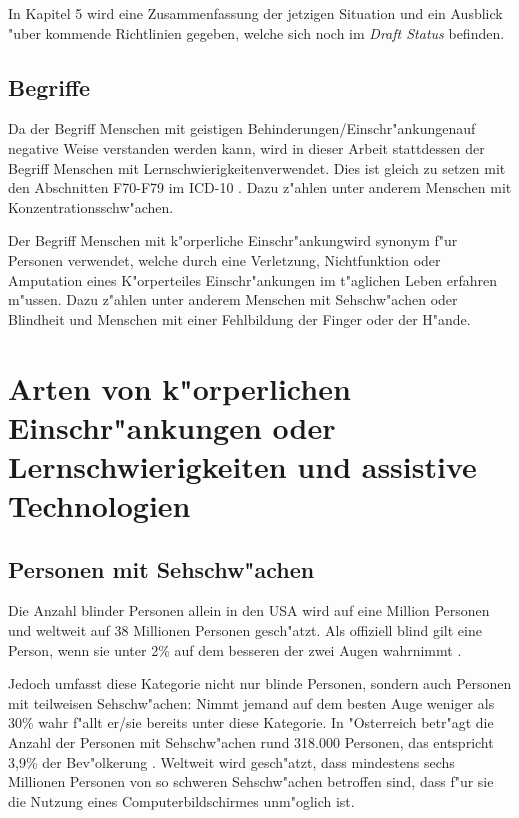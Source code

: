 \documentclass[a4paper,bibtotoc,oneside]{scrbook}
\begin{document}
In Kapitel 5 wird eine Zusammenfassung der jetzigen Situation und ein Ausblick "uber kommende Richtlinien gegeben, welche sich noch im \emph{Draft Status} befinden.

\section{Begriffe}
Da der Begriff \glqq Menschen mit geistigen Behinderungen/Einschr"ankungen\grqq auf negative Weise verstanden werden kann, wird in dieser Arbeit stattdessen der Begriff \glqq Menschen mit Lernschwierigkeiten\grqq  verwendet. Dies ist gleich zu setzen mit den Abschnitten F70-F79 im ICD-10 \cite{icd10}. Dazu z"ahlen unter anderem Menschen mit Konzentrationsschw"achen.


Der Begriff \glqq Menschen mit k"orperliche Einschr"ankung\grqq wird synonym f"ur Personen verwendet, welche durch eine Verletzung, Nichtfunktion oder Amputation eines K"orperteiles Einschr"ankungen im t"aglichen Leben erfahren m"ussen. Dazu z"ahlen unter anderem Menschen mit Sehschw"achen oder Blindheit und Menschen mit einer Fehlbildung der Finger oder der H"ande.

\chapter{Arten von k"orperlichen Einschr"ankungen oder Lernschwierigkeiten
 und assistive Technologien}

\section{Personen mit Sehschw"achen}
Die Anzahl blinder Personen allein in den USA wird auf eine Million Personen und weltweit auf 38 Millionen Personen gesch"atzt\cite[S. 1]{screen_read}.  Als offiziell blind gilt eine Person, wenn sie unter 2\% auf dem besseren der zwei Augen wahrnimmt \cite[S. 12]{understand_acc}. 

Jedoch umfasst diese Kategorie nicht nur blinde Personen, sondern auch Personen mit teilweisen Sehschw"achen: Nimmt jemand auf dem besten Auge weniger als 30\% wahr f"allt er/sie bereits unter diese Kategorie\cite[S. 12]{understand_acc}. In "Osterreich betr"agt die Anzahl der Personen mit Sehschw"achen rund 318.000 Personen, das entspricht 3,9\% der Bev"olkerung \cite[S. 13]{stat_austria}. Weltweit wird gesch"atzt, dass mindestens sechs Millionen Personen von so schweren Sehschw"achen betroffen sind, dass f"ur sie die Nutzung eines Computerbildschirmes unm"oglich ist\cite[S. 249]{screen_read_frust}.
\end{document}
